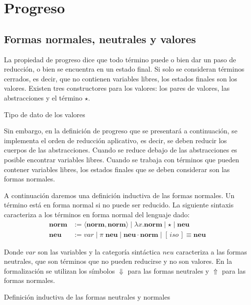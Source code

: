 \section{Progreso}

\subsection{Formas normales, neutrales y valores}

La propiedad de progreso dice que todo término puede o bien dar un paso de reducción, o bien se encuentra en un estado final.
Si solo se consideran términos cerrados, es decir, que no contienen variables libres, los estados finales son los valores.
Existen tres constructores para los valores: los pares de valores, las abstracciones y el término $\star$.

\begin{codigo}
	Tipo de dato de los valores
\end{codigo}

Sin embargo, en la definición de progreso que se presentará a continuación, se implementa el orden de reducción aplicativo, es decir, se deben reducir los cuerpos de las abstracciones.
Cuando se reduce debajo de las abstracciones es posible encontrar variables libres.
Cuando se trabaja con términos que pueden contener variables libres, los estados finales que se deben considerar son las formas normales.

A continuación daremos una definición inductiva de las formas normales. Un término está en forma normal si no puede ser reducido. La siguiente sintaxis caracteriza a los términos en forma normal del lenguaje dado: 
\begin{align*}
	\textbf{norm} &:= \langle \textbf{norm}, \textbf{norm} \rangle \mid \lambda x. \textbf{norm} \mid \star \mid \textbf{neu} \\
	\textbf{neu} &:= var \mid \pi\; \textbf{neu} \mid \textbf{neu} \cdot \textbf{norm} \mid [\, iso \,]\!\!\equiv \textbf{neu}
\end{align*}

Donde $var$ son las variables y la categoría sintáctica $neu$ caracteriza a las formas neutrales, que son términos que no pueden reducirse y no son valores.
En la formalización se utilizan los símbolos $\Downarrow$ para las formas neutrales y $\Uparrow$ para las formas normales.

\begin{codigo}
	Definición inductiva de las formas neutrales y normales
\end{codigo}

